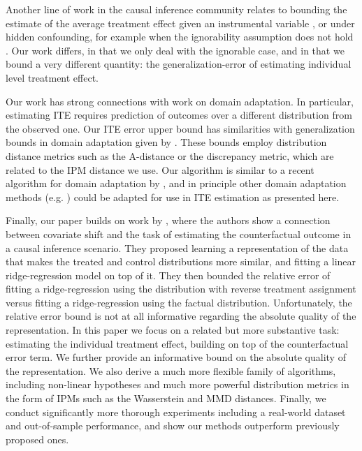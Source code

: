 \documentclass{article}
\begin{document}
Another line of work in the causal inference community relates to bounding the estimate of the average treatment effect given an instrumental variable \citep{balke1997bounds,bareinboim2012controlling}, or under hidden confounding, for example when the ignorability assumption does not hold \citep{pearl2009causality,cai2008bounds}. Our work differs, in that we only deal with the ignorable case, and in that we bound a very different quantity: the generalization-error of estimating individual level treatment effect.

Our work has strong connections with work on domain adaptation. In particular, estimating ITE requires prediction of outcomes over a different distribution from the observed one. Our ITE error upper bound has similarities with generalization bounds in domain adaptation given by \citet{ben2007analysis,mansour2009bdomain,bendavid2010theory,cortes2014domain}.
These bounds employ distribution distance metrics such as the A-distance or the discrepancy metric, which are related to the IPM distance we use. Our algorithm is similar to a recent algorithm for domain adaptation by \citet{JMLR:v17:15-239}, and in principle other domain adaptation methods (e.g. \citet{daume2009frustratingly,pan2011domain,sun2016return}) could be adapted for use in ITE estimation as presented here.

Finally, our paper builds on work by \citet{johansson2016counterfactual}, where the authors show a connection between covariate shift and the task of estimating the counterfactual outcome in a causal inference scenario. They proposed learning a representation of the data that makes the treated and control distributions more similar, and fitting a linear ridge-regression model on top of it. They then bounded the relative error of fitting a ridge-regression using the distribution with reverse treatment  assignment versus fitting a ridge-regression using the factual distribution. Unfortunately, the relative error bound is not at all informative regarding the absolute quality of the representation. In this paper we focus on a related but more substantive task: estimating the individual treatment effect, building on top of the counterfactual error term. We further provide an informative bound on the absolute quality of the representation. We also derive a much more flexible family of algorithms, including non-linear hypotheses and much more powerful distribution metrics in the form of IPMs such as the Wasserstein and MMD distances. Finally, we conduct significantly more thorough experiments including a real-world dataset and out-of-sample performance, and show our methods outperform previously proposed ones.
 
\end{document}
